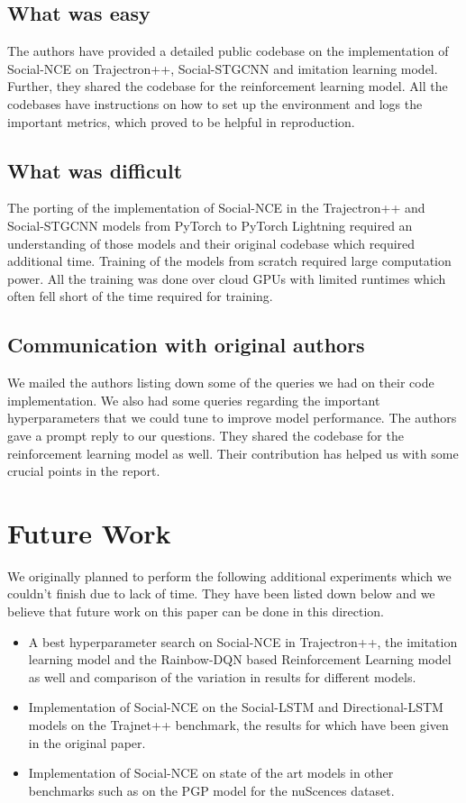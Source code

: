 \subsection{What was easy}
The authors have provided a detailed public codebase on the implementation of Social-NCE on Trajectron++, Social-STGCNN and imitation learning model. Further, they shared the codebase for the reinforcement learning model. All the codebases have instructions on how to set up the environment and logs the important metrics, which proved to be helpful in reproduction. 

\subsection{What was difficult}
The porting of the implementation of Social-NCE in the Trajectron++ and Social-STGCNN models from PyTorch to PyTorch Lightning required an understanding of those models and their original codebase which required additional time. Training of the models from scratch required large computation power. All the training was done over cloud GPUs with limited runtimes which often fell short of the time required for training.

\subsection{Communication with original authors}
We mailed the authors listing down some of the queries we had on their code implementation. We also had some queries regarding the important hyperparameters that we could tune to improve model performance. The authors gave a prompt reply to our questions. They shared the codebase for the reinforcement learning model as well. Their contribution has helped us with some crucial points in the report. 

\section{Future Work}
We originally planned to perform the following additional experiments which we couldn't finish due to lack of time. They have been listed down below and we believe that future work on this paper can be done in this direction.
\begin{itemize}
    \item A best hyperparameter search on Social-NCE in Trajectron++, the imitation learning model and the Rainbow-DQN based Reinforcement Learning model as well and comparison of the variation in results for different models.
    \item Implementation of Social-NCE on the Social-LSTM and Directional-LSTM models on the Trajnet++ benchmark, the results for which have been given in the original paper.
    \item Implementation of Social-NCE on state of the art models in other benchmarks such as on the PGP model \cite {deo2021multimodal} for the nuScences dataset.
\end{itemize}
